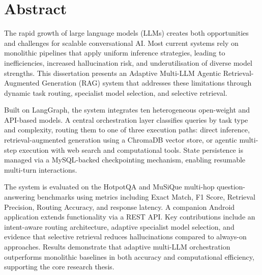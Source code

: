 \documentclass[12pt,a4paper]{article}
\begin{document}
\listoftables
{}
\newpage

\lstlistoflistings
{}
\newpage

\listofalgorithms
{}
\newpage



\newpage
\section*{Abstract}

The rapid growth of large language models (LLMs) creates both opportunities and challenges for scalable conversational AI. Most current systems rely on monolithic pipelines that apply uniform inference strategies, leading to inefficiencies, increased hallucination risk, and underutilisation of diverse model strengths. This dissertation presents an Adaptive Multi-LLM Agentic Retrieval-Augmented Generation (RAG) system that addresses these limitations through dynamic task routing, specialist model selection, and selective retrieval.

Built on LangGraph, the system integrates ten heterogeneous open-weight and API-based models. A central orchestration layer classifies queries by task type and complexity, routing them to one of three execution paths: direct inference, retrieval-augmented generation using a ChromaDB vector store, or agentic multi-step execution with web search and computational tools. State persistence is managed via a MySQL-backed checkpointing mechanism, enabling resumable multi-turn interactions.

The system is evaluated on the HotpotQA and MuSiQue multi-hop question-answering benchmarks using metrics including Exact Match, F1 Score, Retrieval Precision, Routing Accuracy, and response latency. A companion Android application extends functionality via a REST API. Key contributions include an intent-aware routing architecture, adaptive specialist model selection, and evidence that selective retrieval reduces hallucinations compared to always-on approaches. Results demonstrate that adaptive multi-LLM orchestration outperforms monolithic baselines in both accuracy and computational efficiency, supporting the core research thesis.

\newpage
\end{document}
